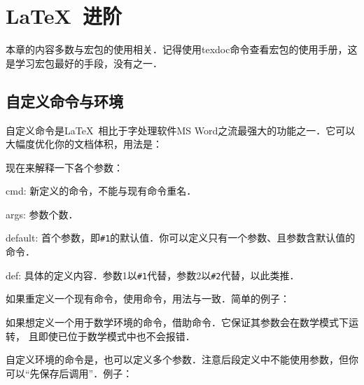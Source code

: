 \chapter{\LaTeX\ 进阶}

本章的内容多数与宏包的使用相关．记得使用texdoc命令查看宏包的使用手册，这是学习宏包最好的手段，没有之一．

\section{自定义命令与环境}
\label{sec:newcommand}
自定义命令是\LaTeX\ 相比于字处理软件MS Word之流最强大的功能之一．它可以大幅度优化你的文档体积，用法是：

现在来解释一下各个参数：
\begin{para}
\item[cmd:] 新定义的命令，不能与现有命令重名．
\item[args:] 参数个数．
\item[default:] 首个参数，即\texttt{\#{}1}的默认值．你可以定义只有一个参数、且参数含默认值的命令．
\item[def:] 具体的定义内容．参数1以\texttt{\#{}1}代替，参数2以\texttt{\#{}2}代替，以此类推．
\end{para}

如果重定义一个现有命令，使用命令，用法与一致．简单的例子：
\begin{latex}
\newcommand{\concept}[1]{\textbf{#1}}
\newcommand{\cop}[2][]{\textbf{#2}}}
\end{latex}

如果想定义一个用于数学环境的命令，借助命令．它保证其参数会在数学模式下运转， 且即使已位于数学模式中也不会报错．
\begin{latex}
\renewcommand\qedsymbol{\ensuremath{\Box}}
\end{latex}

自定义环境的命令是，也可以定义多个参数．注意后段定义中不能使用参数，但你可以“先保存后调用”．例子：
\begin{latex}
\newenvironment{QuoteEnv}[2][]
    {\newcommand\Qauthor{#1}\newcommand\Qref{#2}}
    {\medskip\begin{flushright}\small ——~\Qauthor\\
    \emph{\Qref}\end{flushright}}
\end{latex}

